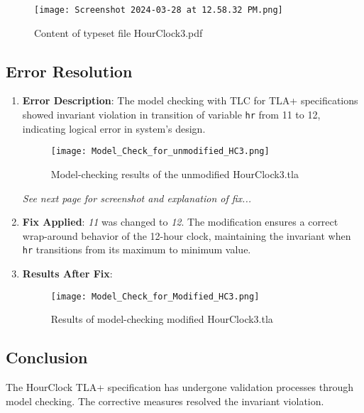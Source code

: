 \documentclass{article}
\begin{document}
\begin{figure}[H]
    \texttt{[image: Screenshot 2024-03-28 at 12.58.32 PM.png]} %
    \caption{Content of typeset file HourClock3.pdf}
    \label{fig:hourclock3pdf}
\end{figure}


\subsection*{Error Resolution}
\begin{enumerate}
    \item \textbf{Error Description}: The model checking with TLC for TLA+ specifications showed invariant violation in transition of variable \texttt{hr} from 11 to 12, indicating logical error in system's design. 
        \begin{figure}[H]
            \texttt{[image: Model\_Check\_for\_unmodified\_HC3.png]} %
            \caption{Model-checking results of the unmodified HourClock3.tla}
            \label{fig:hourclock3modelcheckfixed}
        \end{figure}
    
    \vfill 
    \textit{See next page for screenshot and explanation of fix...}
    \newpage
    \item \textbf{Fix Applied}: \textit{11} was changed to \textit{12}. The modification ensures a correct wrap-around behavior of the 12-hour clock, maintaining the invariant when \texttt{hr} transitions from its maximum to minimum value.
    \item \textbf{Results After Fix}:
        \begin{figure}[H]
            \texttt{[image: Model\_Check\_for\_Modified\_HC3.png]} %
            \caption{Results of model-checking modified HourClock3.tla}
            \label{fig:hourclock3modelcheck}
        \end{figure}
\end{enumerate}

\subsection*{Conclusion}
The HourClock TLA+ specification has undergone validation processes through model checking. The corrective measures resolved the invariant violation. 
\end{document}
